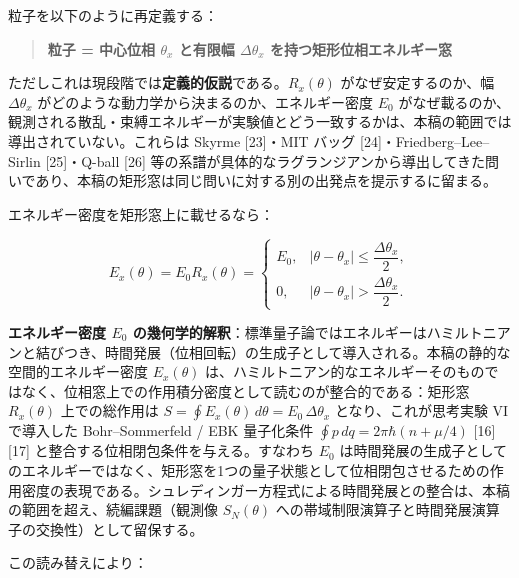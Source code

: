 \documentclass[
]{ltjsarticle}
\begin{document}
粒子を以下のように再定義する：

\begin{quote}
\textbf{粒子 = 中心位相 \(\theta_x\) と有限幅 \(\Delta\theta_x\)
を持つ矩形位相エネルギー窓}
\end{quote}

ただしこれは現段階では\textbf{定義的仮説}である。\(R_x(\theta)\)
がなぜ安定するのか、幅 \(\Delta\theta_x\)
がどのような動力学から決まるのか、エネルギー密度 \(E_0\)
がなぜ載るのか、観測される散乱・束縛エネルギーが実験値とどう一致するかは、本稿の範囲では導出されていない。これらは
Skyrme {[}23{]}・MIT バッグ {[}24{]}・Friedberg--Lee--Sirlin
{[}25{]}・Q-ball {[}26{]}
等の系譜が具体的なラグランジアンから導出してきた問いであり、本稿の矩形窓は同じ問いに対する別の出発点を提示するに留まる。

エネルギー密度を矩形窓上に載せるなら：

\[
E_x(\theta) = E_0 R_x(\theta) = \begin{cases}
E_0, & |\theta - \theta_x| \leq \dfrac{\Delta\theta_x}{2}, \\
0,   & |\theta - \theta_x| > \dfrac{\Delta\theta_x}{2}.
\end{cases}
\]

\textbf{エネルギー密度 \(E_0\)
の幾何学的解釈}：標準量子論ではエネルギーはハミルトニアンと結びつき、時間発展（位相回転）の生成子として導入される。本稿の静的な空間的エネルギー密度
\(E_x(\theta)\)
は、ハミルトニアン的なエネルギーそのものではなく、位相窓上での作用積分密度として読むのが整合的である：矩形窓
\(R_x(\theta)\) 上での総作用は
\(S = \oint E_x(\theta)\, d\theta = E_0\,\Delta\theta_x\)
となり、これが思考実験 VI で導入した Bohr--Sommerfeld / EBK 量子化条件
\(\oint p\, dq = 2\pi\hbar(n + \mu/4)\) {[}16{]}{[}17{]}
と整合する位相閉包条件を与える。すなわち \(E_0\)
は時間発展の生成子としてのエネルギーではなく、矩形窓を1つの量子状態として位相閉包させるための作用密度の表現である。シュレディンガー方程式による時間発展との整合は、本稿の範囲を超え、続編課題（観測像
\(S_N(\theta)\)
への帯域制限演算子と時間発展演算子の交換性）として留保する。

この読み替えにより：
\end{document}
